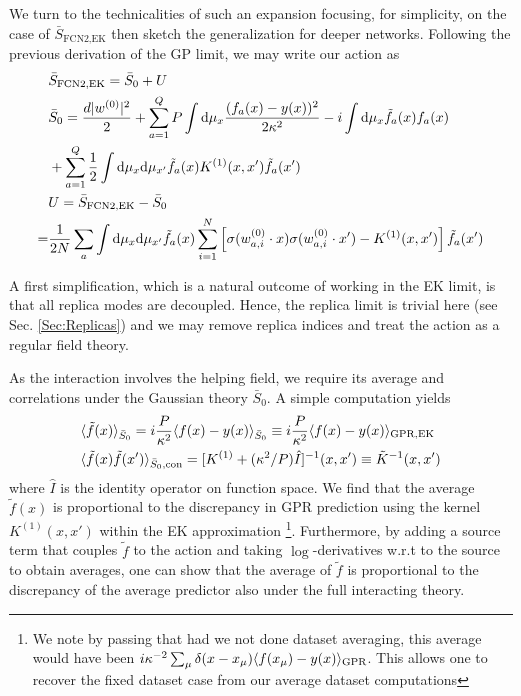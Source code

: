 We turn to the technicalities of such an expansion focusing, for simplicity, on the case of $\bar{S}_{\text{FCN2,EK}}$ then sketch the generalization for deeper networks. Following the previous derivation of the GP limit, we may write our action as 
\begin{align}
&\bar{S}_{\text{FCN2,EK}}= \bar{S}_{0} + U \\ \nonumber 
&\bar{S}_{0} =  \frac{d|{w^{(0)}}|^2}{2}+\sum^Q_{a=1} P\int \text{d} \mu_x \frac{(f_a(x)-y(x))^2}{2\kappa^2} -  i\int \text{d}\mu_x \tilde{f}_a(x) f_a(x) \\ \nonumber &+\sum_{a=1}^Q \frac{1}{2} \int \text{d}\mu_x \text{d}\mu_{x'} \tilde{f}_a(x) K^{(1)}(x,x') \tilde{f}_a(x') \\ \nonumber 
&U = \bar{S}_{\text{FCN2,EK}}-\bar{S}_0 \\ \nonumber 
= & \frac{1}{2N} \sum_{a} \int \text{d}\mu_x \text{d}\mu_{x'} \tilde{f}_a(x) \sum_{i=1}^N\left[\sigma({w}^{(0)}_{a,i} \cdot {x})\sigma({w}^{(0)}_{a,i} \cdot {x'})-K^{(1)}(x,x')\right]\tilde{f}_a(x')
\end{align}
 
A first simplification, which is a natural outcome of working in the EK limit, is that all replica modes are decoupled. Hence, the replica limit is trivial here (see Sec. \ref{Sec:Replicas}) and we may remove replica indices and treat the action as a regular field theory. 

As the interaction involves the helping field, we require its average and correlations under the Gaussian theory $\bar{S}_{0}$. A simple computation yields 
\begin{align}
\label{Eq:tilde_f_averages_EK}
&\langle \tilde{f}(x) \rangle_{\bar{S}_0} = i\frac{P}{\kappa^2} \langle f(x)-y(x) \rangle_{\bar{S}_0} \equiv  i\frac{P}{\kappa^2} \langle f(x)-y(x) \rangle_{\text{GPR},\text{EK}} \\ \nonumber
&\langle \tilde{f}(x)\tilde{f}(x')\rangle_{\bar{S}_0,\text{con}} = [K^{(1)}+(\kappa^2/P) \hat{I}]^{-1}(x,x') \equiv \tilde{K}^{-1}(x,x') 
\end{align}
where $\hat{I}$ is the identity operator on function space. We find that the average $\tilde{f}(x)$ is proportional to the discrepancy in GPR prediction using the kernel $K^{(1)}(x,x')$ within the EK approximation \footnote{We note by passing that had we not done dataset averaging, this average would have been  $i\kappa^{-2} 
\sum_{\mu} \delta(x-x_{\mu}) \langle f(x_{\mu})-y(x)\rangle_{\text{GPR}}$. This allows one to recover the fixed dataset case from our average dataset computations}. Furthermore, by adding a source term that couples $\tilde{f}$ to the action and taking $\log$-derivatives w.r.t to the source to obtain averages, one can show that the average of $\tilde{f}$ is proportional to the discrepancy of the average predictor also under the full interacting theory. 

